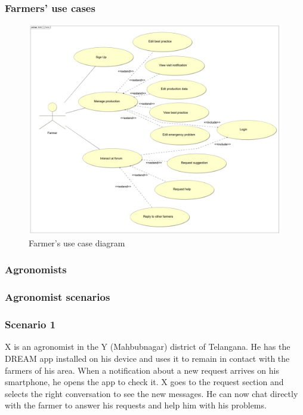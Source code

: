 \subsubsection*{Farmers' use cases}
\begin{figure}[H]
	\centering
    \includegraphics[page=1, width=\textwidth]{Images/ud_fa.JPG}

	\caption{\label{fig:f_use_case_diagram}Farmer's use case diagram}

\end{figure}
\label{sect:farmer_requirements}


\subsubsection{Agronomists}
\subsubsection*{Agronomist scenarios}
\subsubsection*{Scenario 1}
X is an agronomist in the Y (Mahbubnagar) district of Telangana. He has the DREAM app installed on his device and uses it to remain in contact with the farmers of his area. When a notification about a new request arrives on his smartphone, he opens the app to check it. X goes to the request section and selects the right conversation to see the new messages. He can now chat directly with the farmer to answer his requests and help him with his problems.

